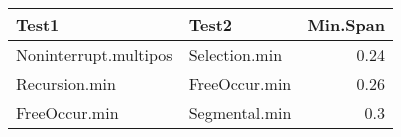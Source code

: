 \begin{table}
\centering
\begin{tabular}{llr}
\toprule
Test1 & Test2 & Min.Span\\
\midrule
Noninterrupt.multipos & Selection.min & \cellcolor{red!25}0.24\\
Recursion.min & FreeOccur.min & \cellcolor{red!25}0.26\\
FreeOccur.min & Segmental.min & \cellcolor{red!25}0.3\\
\bottomrule
\end{tabular}
\end{table}
